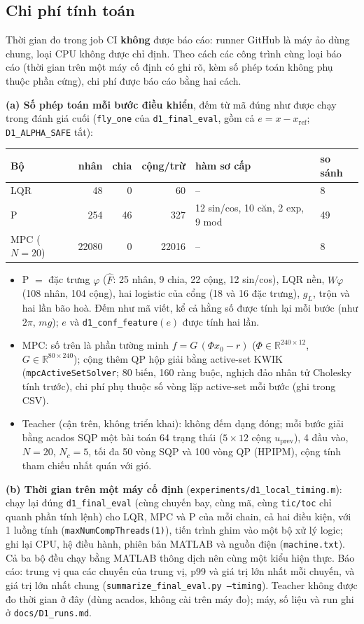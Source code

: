 \documentclass[11pt]{article}
\newcommand{\R}{\mathbb{R}}
\begin{document}
\subsection{Chi phí tính toán}\label{sec:cost}
Thời gian đo trong job CI \textbf{không} được báo cáo: runner GitHub là máy ảo dùng chung, loại CPU không được
chỉ định. Theo cách các công trình cùng loại báo cáo (thời gian trên một máy cố định có ghi rõ, kèm số phép
toán không phụ thuộc phần cứng), chi phí được báo cáo bằng hai cách.

\textbf{(a) Số phép toán mỗi bước điều khiển}, đếm từ mã đúng như được chạy trong đánh giá cuối
(\texttt{fly\_one} của \texttt{d1\_final\_eval}, gồm cả $e=x-x_{\mathrm{ref}}$; \texttt{D1\_ALPHA\_SAFE} tắt):
\begin{center}\small
\begin{tabular}{lrrrll}
\toprule
Bộ & nhân & chia & cộng/trừ & hàm sơ cấp & so sánh\\
\midrule
LQR & 48 & 0 & 60 & -- & 8\\
P & 254 & 46 & 327 & 12 sin/cos, 10 căn, 2 exp, 9 mod & 49\\
MPC ($N=20$) & 22080 & 0 & 22016 & -- & 8\\
\bottomrule
\end{tabular}
\end{center}
\begin{itemize}[leftmargin=1.4em,itemsep=1pt]
\item P $=$ đặc trưng $\varphi$ ($\hat F$: 25 nhân, 9 chia, 22 cộng, 12 sin/cos), LQR nền, $W\varphi$ (108 nhân,
104 cộng), hai logistic của cổng (18 và 16 đặc trưng), $g_L$, trộn và hai lần bão hoà. Đếm như mã viết, kể cả hằng số được tính lại mỗi bước (như $2\pi$, $mg$); $e$ và
\texttt{d1\_conf\_feature}$(e)$ được tính hai lần.
\item MPC: số trên là phần tường minh $f=G\,(\Phi x_0-r)$ ($\Phi\in\R^{240\times12}$, $G\in\R^{80\times240}$);
cộng thêm QP hộp giải bằng active-set KWIK (\texttt{mpcActiveSetSolver}; 80 biến, 160 ràng buộc, nghịch đảo
nhân tử Cholesky tính trước), chi phí phụ thuộc số vòng lặp active-set mỗi bước (ghi trong CSV).
\item Teacher (cận trên, không triển khai): không đếm dạng đóng; mỗi bước giải bằng acados SQP một bài toán
64 trạng thái ($5\times12$ cộng $u_{\mathrm{prev}}$), 4 đầu vào, $N=20$, $N_c=5$, tối đa 50 vòng SQP và 100
vòng QP (HPIPM), cộng tính tham chiếu nhất quán với gió.
\end{itemize}

\textbf{(b) Thời gian trên một máy cố định} (\texttt{experiments/d1\_local\_timing.m}): chạy lại đúng
\texttt{d1\_final\_eval} (cùng chuyến bay, cùng mã, cùng \texttt{tic/toc} chỉ quanh phần tính lệnh) cho LQR,
MPC và P của mỗi chain, cả hai điều kiện, với 1 luồng tính (\texttt{maxNumCompThreads(1)}), tiến trình ghim
vào một bộ xử lý logic; ghi lại CPU, hệ điều hành, phiên bản MATLAB và nguồn điện
(\texttt{machine.txt}). Cả ba bộ đều chạy bằng MATLAB thông dịch nên cùng một kiểu hiện thực. Báo cáo: trung vị
qua các chuyến của trung vị, p99 và giá trị lớn nhất mỗi chuyến, và giá trị lớn nhất chung
(\texttt{summarize\_final\_eval.py --timing}). Teacher không được đo thời gian ở đây (dùng acados, không cài trên máy đo); máy, số liệu và run ghi
ở \texttt{docs/D1\_runs.md}.
\end{document}
